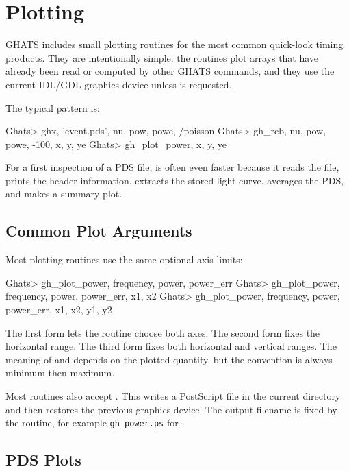 \chapter{Plotting}

GHATS includes small plotting routines for the most common quick-look timing
products.  They are intentionally simple: the routines plot arrays that have
already been read or computed by other GHATS commands, and they use the
current IDL/GDL graphics device unless  is requested.

The typical pattern is:

\begin{ghatsconsole}
Ghats> ghx, 'event.pds', nu, pow, powe, /poisson
Ghats> gh_reb, nu, pow, powe, -100, x, y, ye
Ghats> gh_plot_power, x, y, ye
\end{ghatsconsole}

For a first inspection of a PDS file,  is often even
faster because it reads the file, prints the header information, extracts the
stored light curve, averages the PDS, and makes a summary plot.

\section{Common Plot Arguments}

Most plotting routines use the same optional axis limits:

\begin{ghatsconsole}
Ghats> gh_plot_power, frequency, power, power_err
Ghats> gh_plot_power, frequency, power, power_err, x1, x2
Ghats> gh_plot_power, frequency, power, power_err, x1, x2, y1, y2
\end{ghatsconsole}

The first form lets the routine choose both axes.  The second form fixes the
horizontal range.  The third form fixes both horizontal and vertical ranges.
The meaning of  and  depends on the plotted
quantity, but the convention is always minimum then maximum.

Most routines also accept .  This writes a PostScript file in the
current directory and then restores the previous graphics device.  The output
filename is fixed by the routine, for example \texttt{gh\_power.ps} for
.

\section{PDS Plots}

